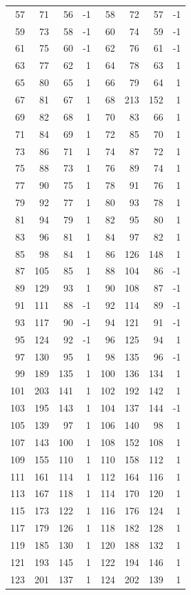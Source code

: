 \begin{longtable}{rrrr@{\qquad}rrrr}
57 & 71 & 56 & -1 & 58 & 72 & 57 & -1\\
59 & 73 & 58 & -1 & 60 & 74 & 59 & -1\\
61 & 75 & 60 & -1 & 62 & 76 & 61 & -1\\
63 & 77 & 62 & 1 & 64 & 78 & 63 & 1\\
65 & 80 & 65 & 1 & 66 & 79 & 64 & 1\\
67 & 81 & 67 & 1 & 68 & 213 & 152 & 1\\
69 & 82 & 68 & 1 & 70 & 83 & 66 & 1\\
71 & 84 & 69 & 1 & 72 & 85 & 70 & 1\\
73 & 86 & 71 & 1 & 74 & 87 & 72 & 1\\
75 & 88 & 73 & 1 & 76 & 89 & 74 & 1\\
77 & 90 & 75 & 1 & 78 & 91 & 76 & 1\\
79 & 92 & 77 & 1 & 80 & 93 & 78 & 1\\
81 & 94 & 79 & 1 & 82 & 95 & 80 & 1\\
83 & 96 & 81 & 1 & 84 & 97 & 82 & 1\\
85 & 98 & 84 & 1 & 86 & 126 & 148 & 1\\
87 & 105 & 85 & 1 & 88 & 104 & 86 & -1\\
89 & 129 & 93 & 1 & 90 & 108 & 87 & -1\\
91 & 111 & 88 & -1 & 92 & 114 & 89 & -1\\
93 & 117 & 90 & -1 & 94 & 121 & 91 & -1\\
95 & 124 & 92 & -1 & 96 & 125 & 94 & 1\\
97 & 130 & 95 & 1 & 98 & 135 & 96 & -1\\
99 & 189 & 135 & 1 & 100 & 136 & 134 & 1\\
101 & 203 & 141 & 1 & 102 & 192 & 142 & 1\\
103 & 195 & 143 & 1 & 104 & 137 & 144 & -1\\
105 & 139 & 97 & 1 & 106 & 140 & 98 & 1\\
107 & 143 & 100 & 1 & 108 & 152 & 108 & 1\\
109 & 155 & 110 & 1 & 110 & 158 & 112 & 1\\
111 & 161 & 114 & 1 & 112 & 164 & 116 & 1\\
113 & 167 & 118 & 1 & 114 & 170 & 120 & 1\\
115 & 173 & 122 & 1 & 116 & 176 & 124 & 1\\
117 & 179 & 126 & 1 & 118 & 182 & 128 & 1\\
119 & 185 & 130 & 1 & 120 & 188 & 132 & 1\\
121 & 193 & 145 & 1 & 122 & 194 & 146 & 1\\
123 & 201 & 137 & 1 & 124 & 202 & 139 & 1\\
\end{longtable}
